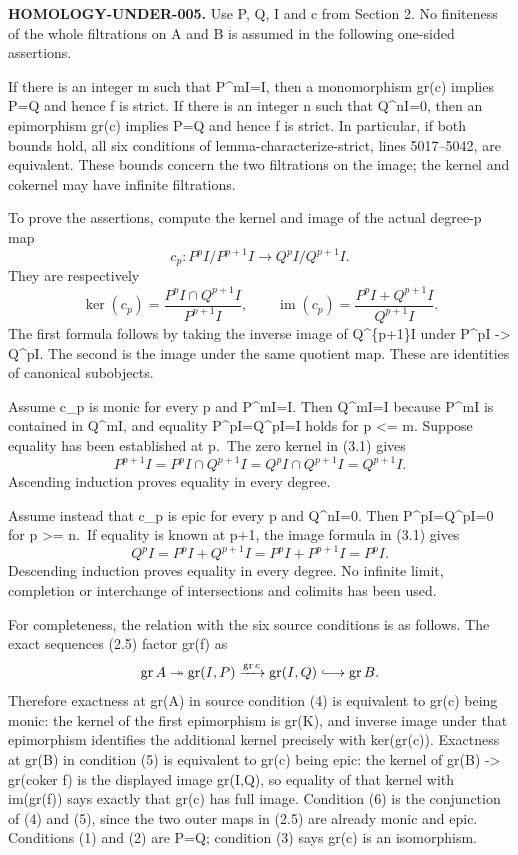 \documentclass[11pt]{article}
\begin{document}
\textbf{HOMOLOGY-UNDER-005.} Use P, Q, I and c from Section 2. No finiteness of the whole filtrations on A and B is assumed in the following one-sided assertions.

If there is an integer m such that P\^{}mI=I, then a monomorphism gr(c) implies P=Q and hence f is strict. If there is an integer n such that Q\^{}nI=0, then an epimorphism gr(c) implies P=Q and hence f is strict. In particular, if both bounds hold, all six conditions of lemma-characterize-strict, lines 5017--5042, are equivalent. These bounds concern the two filtrations on the image; the kernel and cokernel may have infinite filtrations.

To prove the assertions, compute the kernel and image of the actual degree-p map \[
c_p:P^pI/P^{p+1}I\longrightarrow Q^pI/Q^{p+1}I.
\] They are respectively \[
\ker(c_p)=
\frac{P^pI\cap Q^{p+1}I}{P^{p+1}I},\qquad
\operatorname{im}(c_p)=
\frac{P^pI+Q^{p+1}I}{Q^{p+1}I}.                           \tag{3.1}
\] The first formula follows by taking the inverse image of Q\^{}\{p+1\}I under P\^{}pI -\textgreater{} Q\^{}pI. The second is the image under the same quotient map. These are identities of canonical subobjects.

Assume c\_p is monic for every p and P\^{}mI=I. Then Q\^{}mI=I because P\^{}mI is contained in Q\^{}mI, and equality P\^{}pI=Q\^{}pI=I holds for p \textless= m. Suppose equality has been established at p.~The zero kernel in (3.1) gives \[
P^{p+1}I=P^pI\cap Q^{p+1}I
=Q^pI\cap Q^{p+1}I=Q^{p+1}I.
\] Ascending induction proves equality in every degree.

Assume instead that c\_p is epic for every p and Q\^{}nI=0. Then P\^{}pI=Q\^{}pI=0 for p \textgreater= n.~If equality is known at p+1, the image formula in (3.1) gives \[
Q^pI=P^pI+Q^{p+1}I=P^pI+P^{p+1}I=P^pI.
\] Descending induction proves equality in every degree. No infinite limit, completion or interchange of intersections and colimits has been used.

For completeness, the relation with the six source conditions is as follows. The exact sequences (2.5) factor gr(f) as \[
\operatorname{gr}A
\twoheadrightarrow\operatorname{gr}(I,P)
\xrightarrow{\operatorname{gr}c}\operatorname{gr}(I,Q)
\lhook\joinrel\longrightarrow\operatorname{gr}B.
\] Therefore exactness at gr(A) in source condition (4) is equivalent to gr(c) being monic: the kernel of the first epimorphism is gr(K), and inverse image under that epimorphism identifies the additional kernel precisely with ker(gr(c)). Exactness at gr(B) in condition (5) is equivalent to gr(c) being epic: the kernel of gr(B) -\textgreater{} gr(coker f) is the displayed image gr(I,Q), so equality of that kernel with im(gr(f)) says exactly that gr(c) has full image. Condition (6) is the conjunction of (4) and (5), since the two outer maps in (2.5) are already monic and epic. Conditions (1) and (2) are P=Q; condition (3) says gr(c) is an isomorphism.
\end{document}
